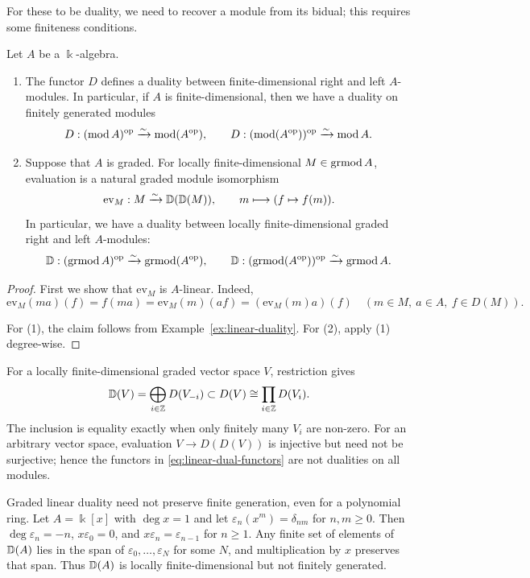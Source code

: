 For these to be duality, we need to recover a module from its bidual; this requires some finiteness conditions.

\begin{lemma}\label{lem:linear-bidual}
Let $A$ be a $\Bbbk$-algebra.
\begin{enumerate}
\item The functor $D$ defines a duality between finite-dimensional right and left $A$-modules.  In particular, if $A$ is finite-dimensional, then we have a duality on finitely generated modules
\[
D: (\operatorname{\mathrm{mod}} A)^{\mathrm{op}} \xrightarrow{\sim}\operatorname{\mathrm{mod}} (A^{\mathrm{op}}), \qquad D: (\operatorname{\mathrm{mod}} (A^{\mathrm{op}}))^{\mathrm{op}} \xrightarrow{\sim}\operatorname{\mathrm{mod}} A.
\]

\item Suppose that $A$ is graded.  For locally finite-dimensional $M\in \operatorname{\mathrm{grmod}} A$, evaluation is a natural graded module isomorphism
\begin{equation}\label{eq:linear-bidual-evaluation}
\mathrm{ev}_M:M\xrightarrow{\sim}\mathbb{D}(\mathbb{D}(M)),\qquad
m\longmapsto(f\mapsto f(m)).
\end{equation}
In particular, we have a duality between locally finite-dimensional graded right and left $A$-modules:
\begin{equation}\label{eq:graded-linear-dual}
\mathbb{D}:(\operatorname{\mathrm{grmod}} A)^{\mathrm{op}}\xrightarrow{\sim}\operatorname{\mathrm{grmod}}(A^{\mathrm{op}}),\qquad
\mathbb{D}:(\operatorname{\mathrm{grmod}}(A^{\mathrm{op}}))^{\mathrm{op}}\xrightarrow{\sim}\operatorname{\mathrm{grmod}} A.
\end{equation}
\end{enumerate}
\end{lemma}

\begin{proof}
First we show that $\mathrm{ev}_M$ is $A$-linear.
Indeed, 
\[
\mathrm{ev}_M(ma)(f)=f(ma)
=\mathrm{ev}_M(m)(af)
=(\mathrm{ev}_M(m)a)(f)
\quad(m\in M,\ a\in A,\ f\in D(M)).
\]

For (1), the claim follows from Example~\ref{ex:linear-duality}.
For (2), apply (1) degree-wise.
\end{proof}

\begin{advanced}
For a locally finite-dimensional graded vector space $V$, restriction gives
\[
\mathbb{D}(V)=\bigoplus_{i\in\mathbb{Z}}D(V_{-i})\subset
D(V)\cong\prod_{i\in\mathbb{Z}}D(V_i).
\]
The inclusion is equality exactly when only finitely many $V_i$ are non-zero.
For an arbitrary vector space, evaluation $V\to D(D(V))$ is injective but need not be surjective; hence the functors in \eqref{eq:linear-dual-functors} are not dualities on all modules.

\begin{example}
Graded linear duality need not preserve finite generation, even for a polynomial ring.
Let $A=\Bbbk[x]$ with $\deg x=1$ and let $\varepsilon_n(x^m)=\delta_{nm}$ for $n,m\geq0$.
Then $\deg\varepsilon_n=-n$, $x\varepsilon_0=0$, and $x\varepsilon_n=\varepsilon_{n-1}$ for $n\geq1$.
Any finite set of elements of $\mathbb{D}(A)$ lies in the span of $\varepsilon_0,\ldots,\varepsilon_N$ for some $N$, and multiplication by $x$ preserves that span.
Thus $\mathbb{D}(A)$ is locally finite-dimensional but not finitely generated.
\end{example}
\end{advanced}

